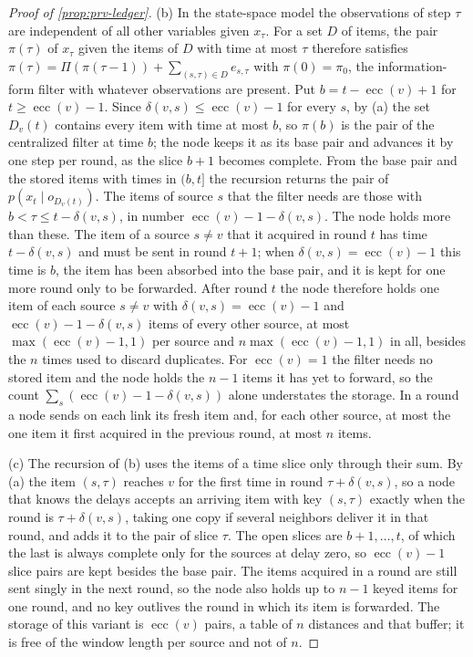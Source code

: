 \begin{proof}[Proof of \cref{prop:prv-ledger}]
(b) In the state-space model the observations of step $\tau$ are independent of all other variables given $x_\tau$. For a set $D$ of items, the pair $\pi(\tau)$ of $x_\tau$ given the items of $D$ with time at most $\tau$ therefore satisfies $\pi(\tau)=\Pi(\pi(\tau-1))+\sum_{(s,\tau)\in D}e_{s,\tau}$ with $\pi(0)=\pi_0$, the information-form filter with whatever observations are present. Put $b=t-\operatorname{ecc}(v)+1$ for $t\ge\operatorname{ecc}(v)-1$. Since $\delta(v,s)\le\operatorname{ecc}(v)-1$ for every $s$, by (a) the set $D_v(t)$ contains every item with time at most $b$, so $\pi(b)$ is the pair of the centralized filter at time $b$; the node keeps it as its base pair and advances it by one step per round, as the slice $b+1$ becomes complete. From the base pair and the stored items with times in $(b,t]$ the recursion returns the pair of $p(x_t\mid o_{D_v(t)})$. The items of source $s$ that the filter needs are those with $b<\tau\le t-\delta(v,s)$, in number $\operatorname{ecc}(v)-1-\delta(v,s)$. The node holds more than these. The item of a source $s\ne v$ that it acquired in round $t$ has time $t-\delta(v,s)$ and must be sent in round $t+1$; when $\delta(v,s)=\operatorname{ecc}(v)-1$ this time is $b$, the item has been absorbed into the base pair, and it is kept for one more round only to be forwarded. After round $t$ the node therefore holds one item of each source $s\ne v$ with $\delta(v,s)=\operatorname{ecc}(v)-1$ and $\operatorname{ecc}(v)-1-\delta(v,s)$ items of every other source, at most $\max(\operatorname{ecc}(v)-1,1)$ per source and $n\max(\operatorname{ecc}(v)-1,1)$ in all, besides the $n$ times used to discard duplicates. For $\operatorname{ecc}(v)=1$ the filter needs no stored item and the node holds the $n-1$ items it has yet to forward, so the count $\sum_s(\operatorname{ecc}(v)-1-\delta(v,s))$ alone understates the storage. In a round a node sends on each link its fresh item and, for each other source, at most the one item it first acquired in the previous round, at most $n$ items.

(c) The recursion of (b) uses the items of a time slice only through their sum. By (a) the item $(s,\tau)$ reaches $v$ for the first time in round $\tau+\delta(v,s)$, so a node that knows the delays accepts an arriving item with key $(s,\tau)$ exactly when the round is $\tau+\delta(v,s)$, taking one copy if several neighbors deliver it in that round, and adds it to the pair of slice $\tau$. The open slices are $b+1,\dots,t$, of which the last is always complete only for the sources at delay zero, so $\operatorname{ecc}(v)-1$ slice pairs are kept besides the base pair. The items acquired in a round are still sent singly in the next round, so the node also holds up to $n-1$ keyed items for one round, and no key outlives the round in which its item is forwarded. The storage of this variant is $\operatorname{ecc}(v)$ pairs, a table of $n$ distances and that buffer; it is free of the window length per source and not of $n$.
\end{proof}

